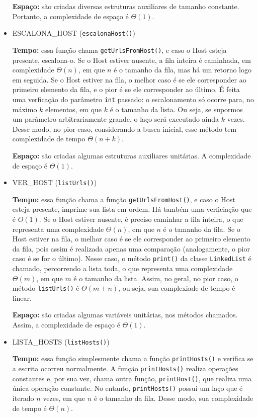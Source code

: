 \documentclass{article}
\def\code#1{\texttt{#1}}
\begin{document}
\begin{itemize}
        \textbf{Espaço:} são criadas diversas estruturas auxiliares de tamanho constante. Portanto, a complexidade de espaço é \( \Theta(1) \).

    \item ESCALONA\_HOST (\code{escalonaHost()})

        \textbf{Tempo:} essa função chama \code{getUrlsFromHost()}, e caso o Host esteja presente, escalona-o. Se o Host estiver ausente, a fila inteira é caminhada, em complexidade \( \Theta(n) \), em que \( n \) é o tamanho da fila, mas há um retorno logo em seguida. Se o Host estiver na fila, o melhor caso é se ele corresponder ao primeiro elemento da fila, e o pior é se ele corresponder ao último. É feita uma verficação do parâmetro \code{int} passado: o escalonamento só ocorre para, no máximo \( k \) elementos, em que \( k \) é o tamanho da lista. Ou seja, se supormos um parâmetro arbitrariamente grande, o laço será executado ainda \( k \) vezes. Desse modo, no pior caso, considerando a busca inicial, esse método tem complexidade de tempo \( \Theta(n+k) \).

        \textbf{Espaço:} são criadas algumas estruturas auxiliares unitárias. A complexidade de espaço é \( \Theta(1) \).

    \item VER\_HOST (\code{listUrls()})

        \textbf{Tempo:} essa função chama a função \code{getUrlsFromHost()}, e caso o Host esteja presente, imprime sua lista em ordem. Há também uma verficiação que é \( O(1) \). Se o Host estiver ausente, é preciso caminhar a fila inteira, o que representa uma complexidade \( \Theta(n) \), em que \( n \) é o tamanho da fila. Se o Host estiver na fila, o melhor caso é se ele corresponder ao primeiro elemento da fila, pois assim é realizada apenas uma comparação (analogamente, o pior caso é se for o último). Nesse caso, o método \code{print()} da classe \code{LinkedList} é chamado, percorrendo a lista toda, o que representa uma complexidade \( \Theta(m) \), em que \( m \) é o tamanho da lista. Assim, no geral, no pior caso, o método \code{listUrls()} é \( \Theta(m + n) \), ou seja, sua complexiade de tempo é linear.

        \textbf{Espaço:} são criadas algumas variáveis unitárias, nos métodos chamados. Assim, a complexidade de espaço é \( \Theta(1) \).

    \item LISTA\_HOSTS (\code{listHosts()})

        \textbf{Tempo:} essa função simplesmente chama a função \code{printHosts()} e verifica se a escrita ocorreu normalmente. A função \code{printHosts()} realiza operações constantes e, por sua vez, chama outra função, \code{printHost()}, que realiza uma única operação constante. No entanto, \code{printHosts()} possui um laço que é iterado \( n \) vezes, em que \( n \) é o tamanho da fila. Desse modo, sua complexidade de tempo é \( \Theta(n) \).


\end{itemize}
\end{document}
